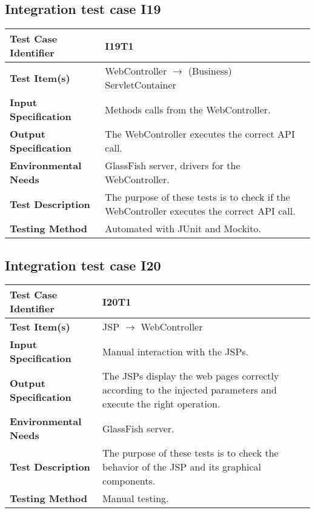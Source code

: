 \vspace{2em}

\subsection {Integration test case I19}

\indent

\vspace{1em}

\begin{tabular}{l p{}}
    \hline
    \textbf{Test Case Identifier} & I19T1\\
    \hline
    \textbf{Test Item(s)} & WebController $\rightarrow$ (Business) ServletContainer \\
    \hline
    \textbf{Input Specification} &  Methods calls from the WebController. \\
    \hline
    \textbf{Output Specification} &  The WebController executes the correct API call. \\
    \hline
    \textbf{Environmental Needs} & GlassFish server, drivers for the WebController. \\
    \hline
    \textbf{Test Description} & The purpose of these tests is to check if the WebController executes the correct API call.  \\
    \hline
    \textbf{Testing Method} & Automated with JUnit and Mockito. \\
    \hline
\end{tabular}

\vspace{2em}

\subsection {Integration test case I20}

\indent

\vspace{1em}

\begin{tabular}{l p{}}
    \hline
    \textbf{Test Case Identifier} & I20T1\\
    \hline
    \textbf{Test Item(s)} & JSP $\rightarrow$ WebController \\
    \hline
    \textbf{Input Specification} & Manual interaction with the JSPs. \\
    \hline
    \textbf{Output Specification} &  The JSPs display the web pages correctly according to the injected parameters and execute the right operation. \\
    \hline
    \textbf{Environmental Needs} & GlassFish server. \\
    \hline
    \textbf{Test Description} & The purpose of these tests is to check the behavior of the JSP and its graphical components.  \\
    \hline
    \textbf{Testing Method} & Manual testing. \\
    \hline
\end{tabular}

